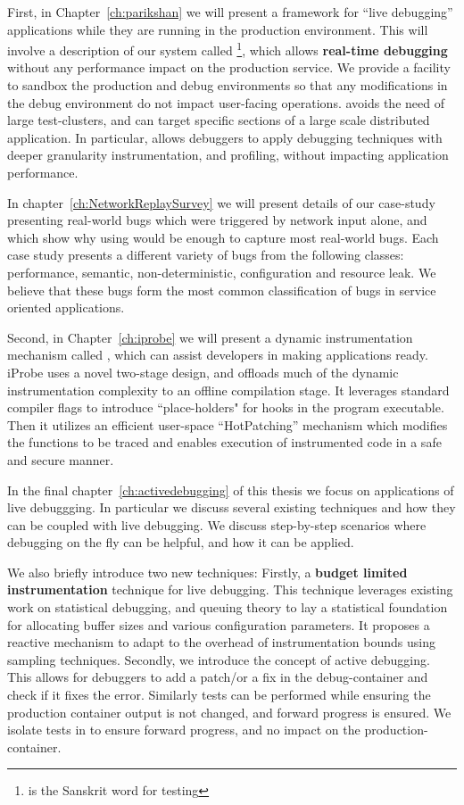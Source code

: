First, in Chapter~\ref{ch:parikshan} we will present a framework for ``live debugging'' applications while they are running in the production environment.
This will involve a description of our system called \parikshan\footnote{\parikshan is the Sanskrit word for  testing}, which allows \textbf{real-time debugging} without any performance impact on the production service.
We provide a facility to sandbox the production and debug environments so that any modifications in the debug environment do not impact user-facing operations.
\parikshan avoids the need of large test-clusters, and can target specific sections of a large scale distributed application.
In particular, \parikshan allows debuggers to apply debugging techniques with deeper granularity instrumentation, and profiling, without impacting application performance.

In chapter~\ref{ch:NetworkReplaySurvey} we will present details of our case-study presenting real-world bugs which were triggered by network input alone, and which show why using \parikshan would be enough to capture most real-world bugs. 
Each case study presents a different variety of bugs from the following classes: performance, semantic, non-deterministic, configuration and resource leak. 
We believe that these bugs form the most common classification of bugs in service oriented applications.

Second, in Chapter~\ref{ch:iprobe} we will present a dynamic instrumentation mechanism called \iprobe, which can assist developers in making applications \parikshan ready.
iProbe uses a novel two-stage design, and offloads much of the dynamic instrumentation complexity to an offline compilation stage.
It leverages standard compiler flags to introduce ``place-holders" for hooks in the program executable.
Then it utilizes an efficient user-space ``HotPatching'' mechanism which modifies the functions to be traced and enables execution of instrumented code in a safe and secure manner.

In the final chapter~\ref{ch:activedebugging} of this thesis we focus on applications of live debuggging. 
In particular we discuss several existing techniques and how they can be coupled with live debugging. 
We discuss step-by-step scenarios where debugging on the fly can be helpful, and how it can be applied.

We also briefly introduce two new techniques: Firstly, a \textbf{budget limited instrumentation} technique for live debugging.
This technique leverages existing work on statistical debugging, and queuing theory to lay a statistical foundation for allocating buffer sizes and various configuration parameters.
It proposes a reactive mechanism to adapt to the overhead of instrumentation bounds using sampling techniques.
Secondly, we introduce the concept of active debugging.
This allows for debuggers to add a patch/or a fix in the debug-container and check if it fixes the error. 
Similarly tests can be performed while ensuring the production container output is not changed, and forward progress is ensured.
We isolate tests in \debugcontainer to ensure forward progress, and no impact on the production-container.


